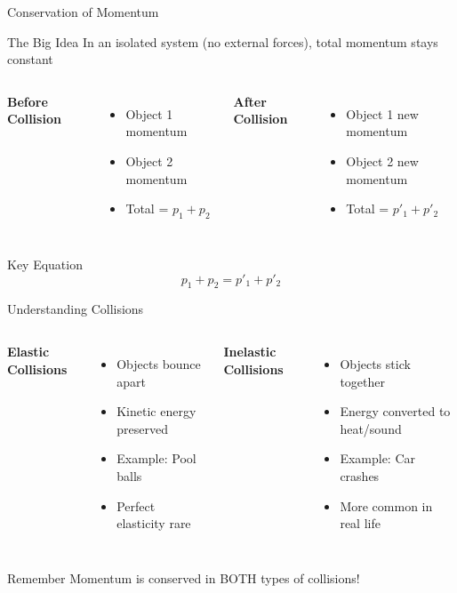 \documentclass{beamer}
\begin{document}
\begin{frame}{Conservation of Momentum}
\begin{block}{The Big Idea}
In an isolated system (no external forces), total momentum stays constant
\end{block}

\pause

\begin{columns}
\textbf{Before Collision}
\begin{itemize}
\item Object 1 momentum
\item Object 2 momentum
\item Total = $p_1 + p_2$
\end{itemize}

\pause

\textbf{After Collision}
\begin{itemize}
\item Object 1 new momentum
\item Object 2 new momentum
\item Total = $p'_1 + p'_2$
\end{itemize}
\end{columns}

\pause

\begin{alertblock}{Key Equation}
$$p_1 + p_2 = p'_1 + p'_2$$
\end{alertblock}
\end{frame}

\begin{frame}{Understanding Collisions}
\begin{columns}
\textbf{Elastic Collisions}
\begin{itemize}
\item Objects bounce apart
\item Kinetic energy preserved
\item Example: Pool balls
\item Perfect elasticity rare
\end{itemize}

\textbf{Inelastic Collisions}
\begin{itemize}
\item Objects stick together
\item Energy converted to heat/sound
\item Example: Car crashes
\item More common in real life
\end{itemize}
\end{columns}

\pause

\begin{alertblock}{Remember}
Momentum is conserved in BOTH types of collisions!
\end{alertblock}
\end{frame}
\end{document}
